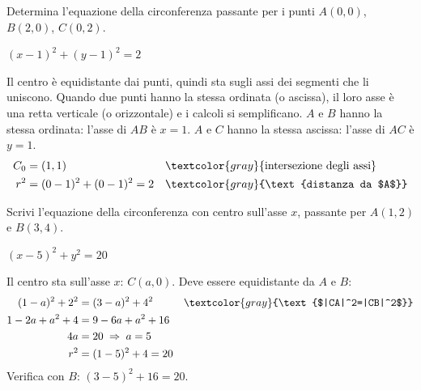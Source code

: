 
\begin{question}[ID=2.6, subtitle={Circonferenza per tre punti $A(0,0)$, $B(2,0)$, $C(0,2)$}, difficulty=media, tags={circonferenza}]
Determina l'equazione della circonferenza passante per i punti $A(0,0)$, $B(2,0)$, $C(0,2)$.
\begin{solution}
$(x-1)^2+(y-1)^2=2$
\end{solution}
\begin{explanation}
Il centro è equidistante dai punti, quindi sta sugli assi dei segmenti che li uniscono. Quando due punti hanno la stessa ordinata (o ascissa), il loro asse è una retta verticale (o orizzontale) e i calcoli si semplificano.
$A$ e $B$ hanno la stessa ordinata: l'asse di $AB$ è $x=1$. $A$ e $C$ hanno la stessa ascissa: l'asse di $AC$ è $y=1$.
\[\begin{aligned}
C_0 &= (1,1) && \textcolor{gray}{\text{intersezione degli assi}}\\
r^2 &= (0-1)^2+(0-1)^2=2 && \textcolor{gray}{\text{distanza da $A$}}
\end{aligned}\]
\end{explanation}
\end{question}


\begin{question}[ID=2.7, subtitle={Circonferenza con centro sull'asse $x$ per $A(1,2)$ e $B(3,4)$}, difficulty=media, tags={circonferenza}]
Scrivi l'equazione della circonferenza con centro sull'asse $x$, passante per $A(1,2)$ e $B(3,4)$.
\begin{solution}
$(x-5)^2+y^2=20$
\end{solution}
\begin{explanation}
Il centro sta sull'asse $x$: $C(a,0)$. Deve essere equidistante da $A$ e $B$:
\[\begin{aligned}
(1-a)^2+2^2 &= (3-a)^2+4^2 && \textcolor{gray}{\text{$|CA|^2=|CB|^2$}}\\
1-2a+a^2+4 &= 9-6a+a^2+16\\
4a &= 20 \;\Rightarrow\; a=5\\
r^2 &= (1-5)^2+4=20
\end{aligned}\]
Verifica con $B$: $(3-5)^2+16=20$.
\end{explanation}
\end{question}


